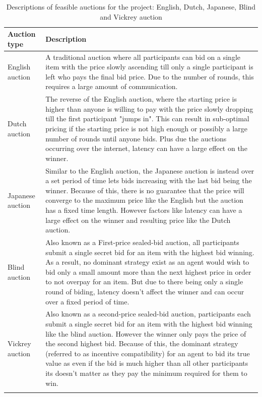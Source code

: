 \begin{longtable}{|p{3.5cm}|p{11cm}|} \hline
    \textbf{Auction type} & \textbf{Description} \\ \hline
    English auction & A traditional auction where all participants can bid on a single item with the price slowly
        ascending till only a single participant is left who pays the final bid price. Due to the number of rounds,
        this requires a large amount of communication. \\ \hline

    Dutch auction & The reverse of the English auction, where the starting price is higher than anyone is willing to
        pay with the price slowly dropping till the first participant "jumps in". This can result in sub-optimal pricing
        if the starting price is not high enough or possibly a large number of rounds until anyone bids. Plus due
        the auctions occurring over the internet, latency can have a large effect on the winner. \\ \hline

    Japanese auction & Similar to the English auction, the Japanese auction is instead over a set period of time lets
        bids increasing with the last bid being the winner. Because of this, there is no guarantee that the price will
        converge to the maximum price like the English but the auction has a fixed time length. However factors like
        latency can have a large effect on the winner and resulting price like the Dutch auction. \\ \hline

    Blind auction & Also known as a First-price sealed-bid auction, all participants submit a single secret bid for an
        item with the highest bid winning. As a result, no dominant strategy exist as an agent would wish to bid only a
        small amount more than the next highest price in order to not overpay for an item. But due to there being only
        a single round of biding, latency doesn't affect the winner and can occur over a fixed period of time. \\ \hline

    Vickrey auction~\citep{vickrey} & Also known as a second-price sealed-bid auction, participants each submit
        a single secret bid for an item with the highest bid winning like the blind auction. However the winner only
        pays the price of the second highest bid. Because of this, the dominant strategy (referred to as incentive
        compatibility) for an agent to bid its true value as even if the bid is much higher than all other participants
        its doesn't matter as they pay the minimum required for them to win. \\ \hline
    \caption{Descriptions of feasible auctions for the project: English, Dutch, Japanese, Blind and Vickrey auction}
    \label{tab:auctions_descriptions}
\end{longtable}

